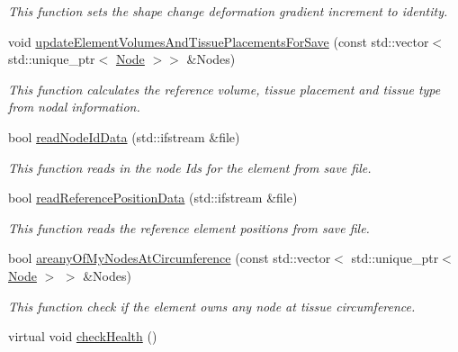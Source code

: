 \begin{DoxyCompactItemize}
\begin{DoxyCompactList}\small\item\em This function sets the shape change deformation gradient increment to identity. \end{DoxyCompactList}\item 
\hypertarget{classShapeBase_a3292b2b5d9fd3430a21914031614ccdd}{}void \hyperlink{classShapeBase_a3292b2b5d9fd3430a21914031614ccdd}{update\+Element\+Volumes\+And\+Tissue\+Placements\+For\+Save} (const std\+::vector$<$ std\+::unique\+\_\+ptr$<$ \hyperlink{classNode}{Node} $>$$>$ \&Nodes)\label{classShapeBase_a3292b2b5d9fd3430a21914031614ccdd}

\begin{DoxyCompactList}\small\item\em This function calculates the reference volume, tissue placement and tissue type from nodal information. \end{DoxyCompactList}\item 
\hypertarget{classShapeBase_a4fba51323da7719de06fba53077eebc4}{}bool \hyperlink{classShapeBase_a4fba51323da7719de06fba53077eebc4}{read\+Node\+Id\+Data} (std\+::ifstream \&file)\label{classShapeBase_a4fba51323da7719de06fba53077eebc4}

\begin{DoxyCompactList}\small\item\em This function reads in the node Ids for the element from save file. \end{DoxyCompactList}\item 
\hypertarget{classShapeBase_a123de76dba6d7d9242c2931d79e47e37}{}bool \hyperlink{classShapeBase_a123de76dba6d7d9242c2931d79e47e37}{read\+Reference\+Position\+Data} (std\+::ifstream \&file)\label{classShapeBase_a123de76dba6d7d9242c2931d79e47e37}

\begin{DoxyCompactList}\small\item\em This function reads the reference element positions from save file. \end{DoxyCompactList}\item 
\hypertarget{classShapeBase_a4aeacce216911def0e0c54b1bb4286bd}{}bool \hyperlink{classShapeBase_a4aeacce216911def0e0c54b1bb4286bd}{areany\+Of\+My\+Nodes\+At\+Circumference} (const std\+::vector$<$ std\+::unique\+\_\+ptr$<$ \hyperlink{classNode}{Node} $>$ $>$ \&Nodes)\label{classShapeBase_a4aeacce216911def0e0c54b1bb4286bd}

\begin{DoxyCompactList}\small\item\em This function check if the element owns any node at tissue circumference. \end{DoxyCompactList}\item 
\hypertarget{classShapeBase_adb6927dd05e3f6aa1c5ac5d32a30b5da}{}virtual void \hyperlink{classShapeBase_adb6927dd05e3f6aa1c5ac5d32a30b5da}{check\+Health} ()\label{classShapeBase_adb6927dd05e3f6aa1c5ac5d32a30b5da}


\end{DoxyCompactItemize}
